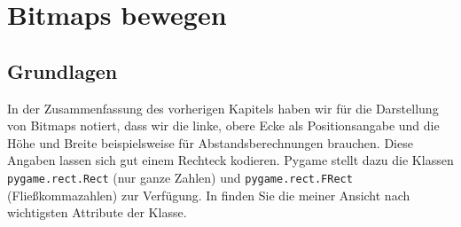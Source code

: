 \newpage
\section{Bitmaps bewegen}
\subsection{Grundlagen}
In der Zusammenfassung des vorherigen Kapitels haben wir für die Darstellung von Bitmaps notiert, dass wir die linke, obere Ecke als Positionsangabe und die Höhe und Breite beispielsweise für Abstandsberechnungen brauchen. Diese Angaben lassen sich gut einem Rechteck kodieren. Pygame stellt dazu die Klassen \texttt{pygame.rect.Rect} (nur ganze Zahlen) und \texttt{pygame.rect.FRect} (Fließkommazahlen) zur Verfügung. In  finden Sie die meiner Ansicht nach wichtigsten Attribute der Klasse.

